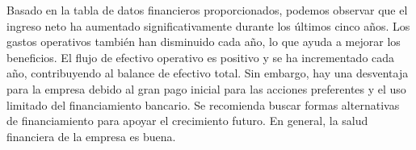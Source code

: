 
                Basado en la tabla de datos financieros proporcionados, podemos observar que el ingreso neto ha aumentado significativamente durante los últimos cinco años. Los gastos operativos también han disminuido cada año, lo que ayuda a mejorar los beneficios. El flujo de efectivo operativo es positivo y se ha incrementado cada año, contribuyendo al balance de efectivo total. Sin embargo, hay una desventaja para la empresa debido al gran pago inicial para las acciones preferentes y el uso limitado del financiamiento bancario. Se recomienda buscar formas alternativas de financiamiento para apoyar el crecimiento futuro. En general, la salud financiera de la empresa es buena.
